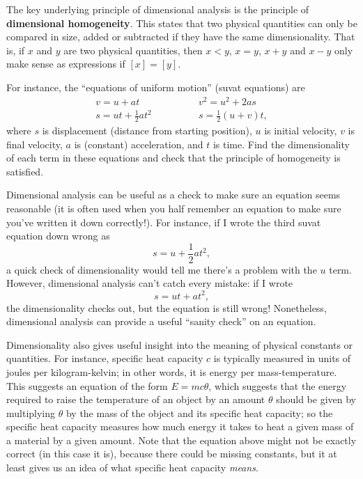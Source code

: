 \documentclass{article}
\begin{document}
The key underlying principle of dimensional analysis is the principle of \textbf{dimensional homogeneity}. This states that two physical quantities can only be compared in size, added or subtracted if they have the same dimensionality. That is, if $x$ and $y$ are two physical quantities, then $x<y$, $x=y$, $x+y$ and $x-y$ only make sense as expressions if $[x]=[y]$.

For instance, the ``equations of uniform motion'' (suvat equations) are
\begin{align*}
	v=u+at\qquad&\qquad  v^2=u^2+2as\\
	s=ut+\frac{1}{2}at^2 \qquad&\qquad s=\frac{1}{2}(u+v)t,
\end{align*}
where $s$ is displacement (distance from starting position), $u$ is initial velocity, $v$ is final velocity, $a$ is (constant) acceleration, and $t$ is time. Find the dimensionality of each term in these equations and check that the principle of homogeneity is satisfied.\bigskip


Dimensional analysis can be useful as a check to make sure an equation seems reasonable (it is often used when you half remember an equation to make sure you've written it down correctly!). For instance, if I wrote the third suvat equation down wrong as
\[s=u+\frac{1}{2}at^2,\]
a quick check of dimensionality would tell me there's a problem with the $u$ term. However, dimensional analysis can't catch every mistake: if I wrote
\[s=ut+at^2,\]
the dimensionality checks out, but the equation is still wrong! Nonetheless, dimensional analysis can provide a useful ``sanity check'' on an equation.

Dimensionality also gives useful insight into the meaning of physical constants or quantities. For instance, specific heat capacity $c$ is typically measured in units of joules per kilogram-kelvin; in other words, it is energy per mass-temperature. This suggests an equation of the form $E=mc\theta$, which suggests that the energy required to raise the temperature of an object by an amount $\theta$ should be given by multiplying $\theta$ by the mass of the object and its specific heat capacity; so the specific heat capacity measures how much energy it takes to heat a given mass of a material by a given amount. Note that the equation above might not be exactly correct (in this case it is), because there could be missing constants, but it at least gives us an idea of what specific heat capacity \textit{means}.


\clearpage
\end{document}
